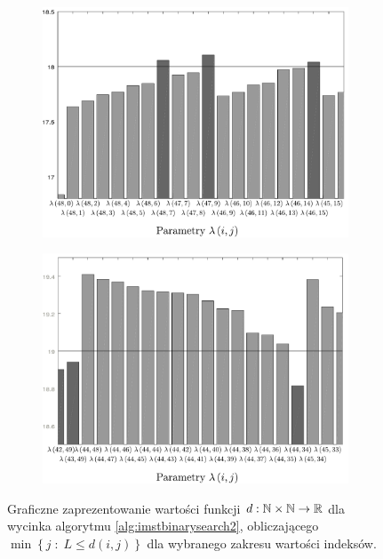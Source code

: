 \begin{figure}[!htbp]
	\null\hfill
	\begin{subfigure}[b]{0.45\textwidth}
		\includegraphics[width=\textwidth]{Chapter_IV/INC_MST_LAMBDA-chart/min}
		\caption{}
		\label{fig:imstdminmax:a}
	\end{subfigure}
	\hfill
	\begin{subfigure}[b]{0.45\textwidth}
		\includegraphics[width=\textwidth]{Chapter_IV/INC_MST_LAMBDA-chart/max}
		\caption{}
		\label{fig:imstdminmax:b}
	\end{subfigure}
	\hfill\null
	\caption{
		Graficzne zaprezentowanie wartości funkcji $d: \mathbb{N} \times \mathbb{N} \rightarrow \mathbb{R}$ dla wycinka algorytmu \ref{alg:imstbinarysearch2}, obliczającego $\min \left\{ j \; : \; L \leqslant d \left( i, j \right) \right\}$ dla wybranego zakresu wartości indeksów. 
}
\end{figure}
